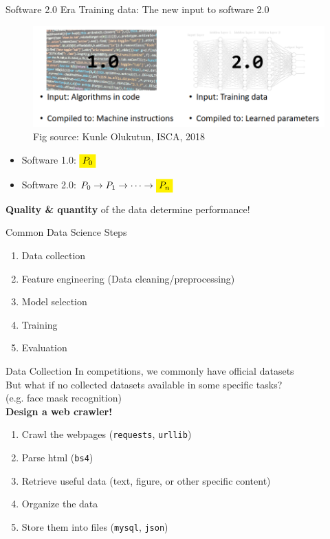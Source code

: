 \documentclass{../TexTemplate/myslide}
\begin{document}
\begin{frame}{Software 2.0 Era}
Training data: The new input to software 2.0
\begin{figure}
\centering
\includegraphics[width=0.9\linewidth]{fig/software2.png}
\caption*{\scriptsize Fig source: Kunle Olukutun, ISCA, 2018}
\end{figure}
\vspace{-5pt}
\begin{itemize}
\item Software 1.0: $\colorbox{yellow}{$P_0$}$
\item Software 2.0: $P_0\to P_1\to \cdots \to \colorbox{yellow}{$P_n$}$
\end{itemize}
\pause
\textbf{Quality \& quantity} of the data determine performance!
\end{frame}

\begin{frame}{Common Data Science Steps}
\begin{enumerate}
	\item Data collection
	\item Feature engineering (Data cleaning/preprocessing)
	\item Model selection
	\item Training
	\item Evaluation
\end{enumerate}
\end{frame}

\begin{frame}[fragile]{Data Collection}
In competitions, we commonly have official datasets\\
But what if no collected datasets available in some specific tasks?\\
(e.g. face mask recognition)\\
\pause
\textbf{Design a web crawler!}
\begin{enumerate}
	\item Crawl the webpages (\verb'requests', \verb'urllib')
	\item Parse html (\verb'bs4')
	\item Retrieve useful data (text, figure, or other specific content)
	\item Organize the data
	\item Store them into files (\verb'mysql', \verb'json')
\end{enumerate}
\end{frame}
\end{document}
